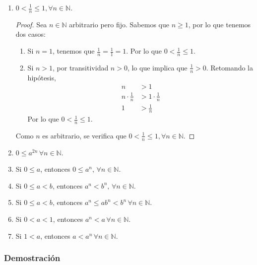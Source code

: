 \documentclass[11pt]{article}
\newcommand{\N}{\mathbb{N}}
\begin{document}
\begin{enumerate}[label=\alph*)]
    \item $0<\frac{1}{n}\leq 1, \forall n\in \N$.
    \vspace{-1em}\begin{proof} 
        Sea $n\in \N$ arbitrario pero fijo. Sabemos que $n\geq 1$, por lo que tenemos dos casos: \begin{enumerate}[label=\roman*)]
            \item Si $n=1$, tenemos que $\frac{1}{n}=\frac{1}{1}=1$. Por lo que $0<\frac{1}{n}\leq 1$.
            \item Si $n>1$, por transitividad $n>0$, lo que implica que $\frac{1}{n}>0$. Retomando la hipótesis, \begin{align*}
                n &> 1\\
                n \cdot \frac{1}{n} &> 1\cdot \frac{1}{n}\\
                1 &> \frac{1}{n}
            \end{align*} Por lo que $0<\frac{1}{n}\leq 1$. 
        \end{enumerate} Como $n$ es arbitrario, se verifica que $0<\frac{1}{n}\leq 1, \forall n\in \N$.
    \end{proof} \vspace{-1em}
    \item $0 \leq a^{2n} \, \forall n\in \N$.
    \item Si $0\leq a$, entonces $ 0 \leq a^n, \, \forall n\in \N$.
    \item Si $0 \leq a <b$, entonces $a^n < b^n, \, \forall n\in \N$.
    \item Si $0 \leq a <b$, entonces $a^n \leq ab^n < b^n \, \forall n\in \N$.
    \item Si $0<a<1$, entonces $a^n<a \, \forall n\in \N$.
    \item Si $1<a$, entonces $a<a^n \, \forall n\in \N$.
\end{enumerate}

\subsubsection*{Demostración}
\end{document}
